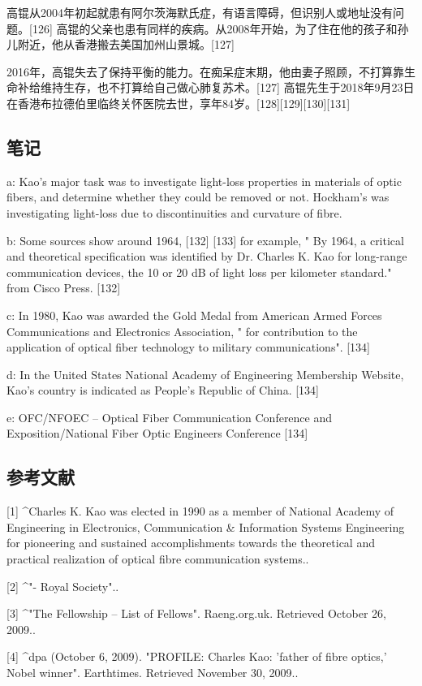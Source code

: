 高锟从2004年初起就患有阿尔茨海默氏症，有语言障碍，但识别人或地址没有问题。[126] 高锟的父亲也患有同样的疾病。从2008年开始，为了住在他的孩子和孙儿附近，他从香港搬去美国加州山景城。[127]

2016年，高锟失去了保持平衡的能力。在痴呆症末期，他由妻子照顾，不打算靠生命补给维持生存，也不打算给自己做心肺复苏术。[127] 高锟先生于2018年9月23日在香港布拉德伯里临终关怀医院去世，享年84岁。[128][129][130][131]

\subsection{笔记}
a:  Kao's major task was to investigate light-loss properties in materials of optic fibers, and determine whether they could be removed or not. Hockham's was investigating light-loss due to discontinuities and curvature of fibre.   

b:  Some sources show around 1964, [132] [133] for example, " By 1964, a critical and theoretical specification was identified by Dr. Charles K. Kao for long-range communication devices, the 10 or 20 dB of light loss per kilometer standard." from Cisco Press. [132]    

c:  In 1980, Kao was awarded the Gold Medal from American Armed Forces Communications and Electronics Association, " for contribution to the application of optical fiber technology to military communications". [134]    

d:  In the United States National Academy of Engineering Membership Website, Kao's country is indicated as People's Republic of China. [134]    

e:   OFC/NFOEC – Optical Fiber Communication Conference and Exposition/National Fiber Optic Engineers Conference [134]

\subsection{参考文献}
[1]
^Charles K. Kao was elected in 1990 as a member of National Academy of Engineering in Electronics, Communication & Information Systems Engineering for pioneering and sustained accomplishments towards the theoretical and practical realization of optical fibre communication systems..

[2]
^"- Royal Society"..

[3]
^"The Fellowship – List of Fellows". Raeng.org.uk. Retrieved October 26, 2009..

[4]
^dpa (October 6, 2009). "PROFILE: Charles Kao: 'father of fibre optics,' Nobel winner". Earthtimes. Retrieved November 30, 2009..

